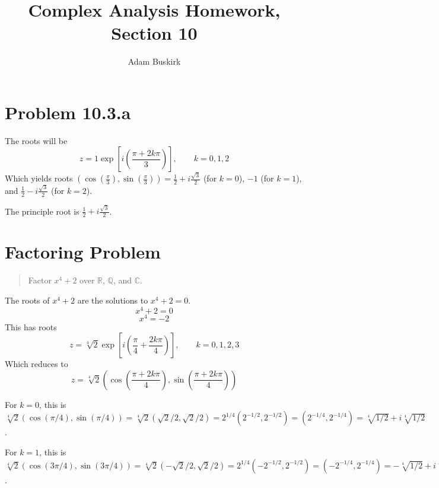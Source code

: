 \documentclass{article}
\title{Complex Analysis Homework, Section 10}
\author{Adam Buskirk}
\theoremstyle{definition}
\newcommand{\R}{\mathbb{R}}
\newcommand{\Q}{\mathbb{Q}}
\newcommand{\Co}{\mathbb{C}}
\newcommand{\p}[1]{\left(#1\right)}
\newcommand{\sq}[1]{\left[#1\right]}
\begin{document}
\maketitle

\section{Problem 10.3.a}
The roots will be
\[ z = 1 \exp \sq{i\p{ \frac{\pi+2k\pi}{3} }}, \qquad k=0,1,2 \]
Which yields roots $(\cos(\frac{\pi}{3}),\sin(\frac{\pi}{3}))=\frac{1}{2}+i\frac{\sqrt{3}}{2}$
(for $k=0$),
$-1$ (for $k=1$),
and $\frac{1}{2}-i\frac{\sqrt{3}}{2}$ (for $k=2$).

\begin{figure}[h]\centering
{}
\end{figure}

The principle root is $\frac{1}{2} + i \frac{\sqrt{3}}{2}$.

\section{Factoring Problem}
\begin{quote}
Factor $x^4+2$ over $\R$, $\Q$, and $\Co$.
\end{quote}

The roots of $x^4+2$ are the solutions to $x^4+2=0$.
\[ x^4+2=0 \]
\[ x^4= -2 \]
This has roots 
\[ 
z = \sqrt[4]{2} \exp\sq{ i \p{\frac{\pi}{4} + \frac{2k\pi}{4}} },
\qquad
k = 0,1,2,3
\]
Which reduces to
\[
z =\sqrt[4]{2} 
\p{ \cos\p{\frac{\pi+2k\pi}{4}} , \sin\p{\frac{\pi+2k\pi}{4}} }
\]

For $k=0$, this is $\sqrt[4]{2} (\cos(\pi/4),\sin(\pi/4)) = \sqrt[4]{2} (\sqrt{2}/2,\sqrt{2}/2) 
= 2^{1/4} \p{ 2^{-1/2} , 2^{-1/2} } = (2^{-1/4},2^{-1/4}) = \sqrt[4]{1/2} + i \sqrt[4]{1/2}$.

For $k=1$, this is $\sqrt[4]{2} (\cos(3\pi/4),\sin(3\pi/4)) 
= \sqrt[4]{2} (-\sqrt{2}/2,\sqrt{2}/2 )
= 2^{1/4} (-2^{-1/2} , 2^{-1/2} )
= (-2^{-1/4} , 2^{-1/4})
= -\sqrt[4]{1/2} + i \sqrt[4]{1/2}$.
\end{document}
